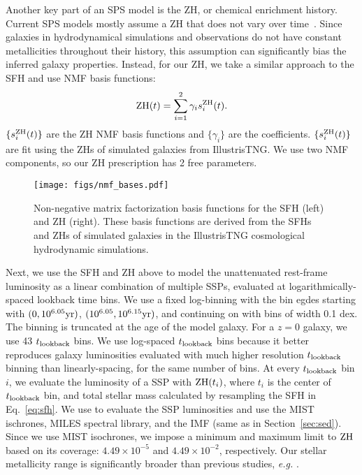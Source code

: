 Another key part of an SPS model is the ZH, or chemical enrichment history. 
Current SPS models mostly assume a ZH that does not vary over
time~\citep{carnall2017, leja2019}. 
Since galaxies in hydrodynamical simulations and observations do not have
constant metallicities throughout their history, this assumption can
significantly bias the inferred galaxy properties. 
Instead, for our ZH, we take a similar approach to the SFH and use NMF basis
functions:
\begin{equation}
    {\rm ZH}(t) = \sum\limits_{i=1}^2 \gamma_i s_i^{\rm ZH}(t).
\end{equation} 
$\{s_i^{\rm ZH}(t)\}$ are the ZH NMF basis functions and $\{\gamma_i\}$ are the
coefficients. 
$\{s_i^{\rm ZH}(t)\}$ are fit using the ZHs of simulated galaxies from IllustrisTNG. 
We use two NMF components, so our ZH prescription has 2 free parameters. 

\begin{figure}
\begin{center}
\texttt{[image: figs/nmf\_bases.pdf]} 
    \label{fig:nmf}
    \caption{
        Non-negative matrix factorization basis functions for the SFH
        (left) and ZH (right). 
        These basis functions are derived from the SFHs and ZHs of simulated
        galaxies in the IllustrisTNG cosmological hydrodynamic simulations. 
    }
\end{center}
\end{figure}

Next, we use the SFH and ZH above to model the unattenuated rest-frame
luminosity as a linear combination of multiple SSPs, evaluated at
logarithmically-spaced lookback time bins.
We use a fixed log-binning with the bin egdes starting with $(0, 10^{6.05}{\rm
yr})$, $(10^{6.05}, 10^{6.15}{\rm yr})$, and continuing on with bins of width
0.1 dex.
The binning is truncated at the age of the model galaxy. 
For a $z=0$ galaxy, we use 43 $t_{\rm lookback}$ bins.
We use log-spaced $t_{\rm lookback}$ bins because it better reproduces galaxy luminosities
evaluated with much higher resolution $t_{\rm lookback}$ binning than linearly-spacing, for
the same number of bins. 
At every $t_{\rm lookback}$ bin $i$, we evaluate the luminosity of a SSP with ${\rm
ZH}(t_i)$, where $t_i$ is the center of $t_{\rm lookback}$ bin, and total stellar mass
calculated by resampling the SFH in Eq.~\ref{eq:sfh}. 
We use \fsps to evaluate the SSP luminosities and use the MIST ischrones, MILES
spectral library, and the \cite{chabrier2003} IMF (same as in
Section~\ref{sec:sed}).  
Since we use MIST isochrones, we impose a minimum and maximum limit to ${\rm
ZH}$ based on its coverage: $4.49\times10^{-5}$ and $4.49\times10^{-2}$,
respectively.
Our stellar metallicity range is significantly broader than previous studies,
\emph{e.g.} \cite{carnall2017, leja2017, tacchella2021}. 

